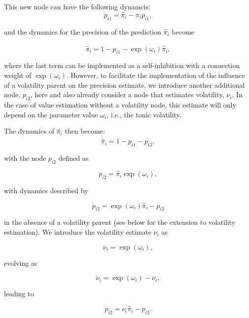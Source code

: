 This new node can have the following dynamcis:
\begin{equation}
	\dot{p}_{i1} = \hat{\pi}_i - \pi_i p_{i1}, 
\end{equation}

and the dynamics for the precision of the prediction $\hat{\pi}_i$ become

\begin{equation}
	\dot{\hat{\pi}}_i = 1 - p_{i1} - \exp(\omega_i) \hat{\pi}_i,
\end{equation}

where the last term can be implemented as a self-inhibition with a connection weight of $\exp(\omega_i)$. However, to facilitate the implementation of the influence of a volatility parent on the precision estimate, we introduce another additional node, $p_{i2}$, here and also already consider a node that estimates volatility, $\nu_i$. In the case of value estimation without a volatility node, this estimate will only depend on the parameter value $\omega_i$, i.e., the tonic volatility.

The dynamics of $\hat{\pi}_i$ then become:
\begin{equation}
	\dot{\hat{\pi}}_i = 1 - p_{i1} - p_{i2},
\end{equation}

with the node $p_{i2}$ defined as 

\begin{equation}
	p_{i2} = \hat{\pi}_i \exp(\omega_i),
\end{equation}

with dynamics described by

\begin{equation}
	\dot{p}_{i2} = \exp(\omega_i) \hat{\pi}_i - p_{i2}
\end{equation}

in the absence of a volatility parent (see below for the extension to volatility estimation). We introduce the volatility estimate $\nu_i$ as

\begin{equation}
	\nu_i = \exp(\omega_i),
\end{equation}
 
 evolving as

\begin{equation}
	\dot{\nu}_i = \exp(\omega_i) - \nu_i,
\end{equation}

leading to 

\begin{equation}
	\dot{p}_{i2} = \nu_i \hat{\pi}_i - p_{i2}.
\end{equation}

